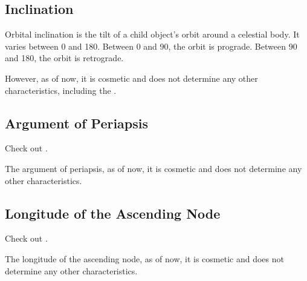 \documentclass[letterpaper,10pt,english]{sphinxmanual}
\begin{document}
\subsection{Inclination}
\label{\detokenize{quantities/orbital/inclination:inclination}}\label{\detokenize{quantities/orbital/inclination::doc}}\label{\detokenize{quantities/orbital/inclination:id1}}
\sphinxAtStartPar
Orbital inclination is the tilt of a child object’s orbit around a celestial body.
It varies between 0 and 180. Between 0 and 90, the orbit is prograde.
Between 90 and 180, the orbit is retrograde.

\sphinxAtStartPar
However, as of now, it is cosmetic and does not determine any other characteristics,
including the {\hyperref[\detokenize{quantities/orbital/orbit_type:id1}]{}}.


\subsection{Argument of Periapsis}
\label{\detokenize{quantities/orbital/argument_of_periapsis:argument-of-periapsis}}\label{\detokenize{quantities/orbital/argument_of_periapsis::doc}}\label{\detokenize{quantities/orbital/argument_of_periapsis:id1}}
\sphinxAtStartPar
Check out .

\sphinxAtStartPar
The argument of periapsis, as of now, it is cosmetic and does not determine any other characteristics.


\subsection{Longitude of the Ascending Node}
\label{\detokenize{quantities/orbital/longitude_of_the_ascending_node:longitude-of-the-ascending-node}}\label{\detokenize{quantities/orbital/longitude_of_the_ascending_node::doc}}\label{\detokenize{quantities/orbital/longitude_of_the_ascending_node:id1}}
\sphinxAtStartPar
Check out .

\sphinxAtStartPar
The longitude of the ascending node, as of now, it is cosmetic and does
not determine any other characteristics.
\end{document}

